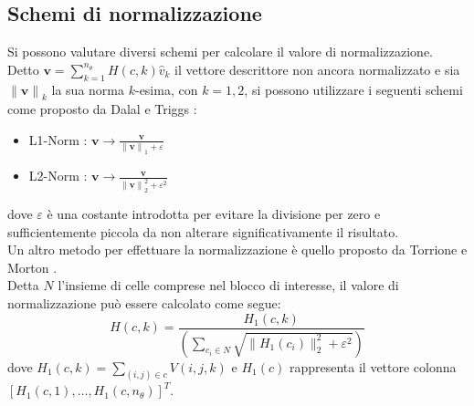 \subsection{Schemi di normalizzazione}
Si possono valutare diversi schemi per calcolare il valore di normalizzazione. \\
Detto $\textbf{v}= \sum_{k=1}^{n_\theta} H(c,k)\hat{v}_k$ il vettore descrittore non ancora normalizzato e sia ${\|\textbf{v}\|}_{k}$ la sua norma $k$-esima, con $k=1,2$, si possono utilizzare i seguenti schemi come proposto da Dalal e Triggs \citep{Art_HOGHuman}:
\begin{itemize}
\item L1-Norm : $\textbf{v} \rightarrow\frac{\textbf{v}}{{\|\textbf{v}\|}_{1}+\varepsilon} $
\item L2-Norm :  $\textbf{v} \rightarrow\frac{\textbf{v}}{{\|\textbf{v}\|}_{2}^2+{\varepsilon}^2} $
\end{itemize}
dove $\varepsilon$ è una costante introdotta per evitare la divisione per zero e sufficientemente piccola da non alterare significativamente il risultato.
\\
Un altro metodo per effettuare la normalizzazione è quello proposto da Torrione e Morton \citep{Art_HOGLandmine}. \\
Detta $N$ l'insieme di celle comprese nel blocco di interesse, il valore di normalizzazione può essere calcolato come segue:
\begin{equation}
\label{eq:normalizzazione}
H(c,k)= \frac{H_{1}(c,k)}{\left ( \sum_{c_i\in N} \sqrt{\|H_{1}(c_i)\|^2_2+\varepsilon^2}\right )}
\end{equation}
dove $H_1(c,k)=\sum_{(i,j)\in c}V(i,j,k)$ e $H_1(c)$ rappresenta il vettore colonna\\
 $[H_1(c,1),\ldots, H_1(c,n_{\theta}) ]^T$.
 
